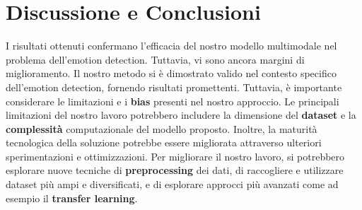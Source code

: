 \documentclass{article}
\begin{document}
\section{Discussione e Conclusioni}
I risultati ottenuti confermano l'efficacia del nostro modello multimodale nel problema dell'emotion detection. Tuttavia, vi sono ancora margini di miglioramento.
Il nostro metodo si è dimostrato valido nel contesto specifico dell'emotion detection, fornendo risultati promettenti. Tuttavia, è importante considerare le limitazioni e i \textbf{bias} presenti nel nostro approccio.
Le principali limitazioni del nostro lavoro potrebbero includere la dimensione del \textbf{dataset} e la \textbf{complessità} computazionale del modello proposto. Inoltre, la maturità tecnologica della soluzione potrebbe essere migliorata attraverso ulteriori sperimentazioni e ottimizzazioni.
Per migliorare il nostro lavoro, si potrebbero esplorare nuove tecniche di \textbf{preprocessing} dei dati, di raccogliere e utilizzare dataset più ampi e diversificati, e di esplorare approcci più avanzati come ad esempio il \textbf{transfer learning}.
\end{document}
